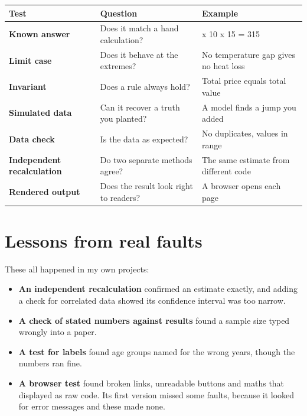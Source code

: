 {\def\LTcaptype{none} %
\begin{longtable}[]{@{}
  >{\raggedright\arraybackslash}p{}
  >{\raggedright\arraybackslash}p{}
  >{\raggedright\arraybackslash}p{}@{}}
\toprule\noalign{}
\begin{minipage}[b]{\linewidth}\raggedright
Test
\end{minipage} & \begin{minipage}[b]{\linewidth}\raggedright
Question
\end{minipage} & \begin{minipage}[b]{\linewidth}\raggedright
Example
\end{minipage} \\
\midrule\noalign{}
\endhead
\bottomrule\noalign{}
\endlastfoot
\textbf{Known answer} & Does it match a hand calculation? & 2.1 x 10 x 15 = 315 \\
\textbf{Limit case} & Does it behave at the extremes? & No temperature gap gives no heat loss \\
\textbf{Invariant} & Does a rule always hold? & Total price equals total value \\
\textbf{Simulated data} & Can it recover a truth you planted? & A model finds a jump you added \\
\textbf{Data check} & Is the data as expected? & No duplicates, values in range \\
\textbf{Independent recalculation} & Do two separate methods agree? & The same estimate from different code \\
\textbf{Rendered output} & Does the result look right to readers? & A browser opens each page \\
\end{longtable}
}

\section{Lessons from real faults}\label{lessons-from-real-faults}

These all happened in my own projects:

\begin{itemize}
\tightlist
\item
  \textbf{An independent recalculation} confirmed an estimate exactly, and adding a check for correlated data showed its confidence interval was too narrow.
\item
  \textbf{A check of stated numbers against results} found a sample size typed wrongly into a paper.
\item
  \textbf{A test for labels} found age groups named for the wrong years, though the numbers ran fine.
\item
  \textbf{A browser test} found broken links, unreadable buttons and maths that displayed as raw code. Its first version missed some faults, because it looked for error messages and these made none.
\end{itemize}

